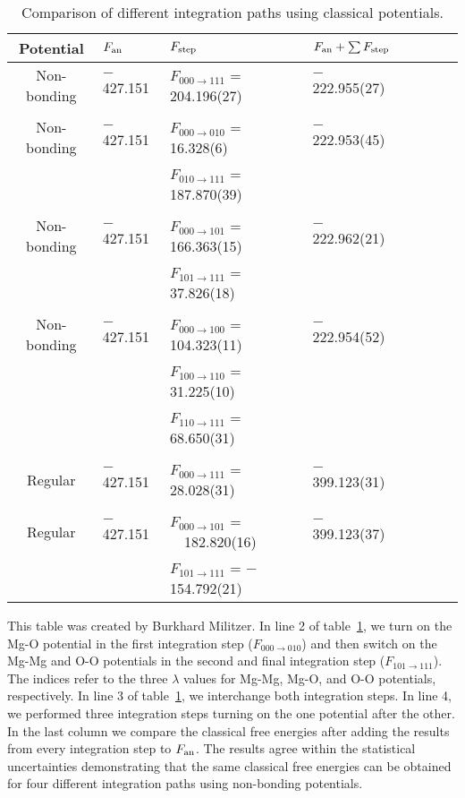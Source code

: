  \begin{table}[!h]
     \centering
\caption{Comparison of different integration paths using classical potentials. 
  \label{tab:compare_int_path}}

     \begin{tabular}{clllllll}
         \hline
{Potential} & 
            {$F_{\rm an}$} & 
            {$F_{\rm step}$} & 
            {$F_{\rm an} + \sum F_{\rm step}$} \\
         \hline
Non-bonding & $-$427.151 & $F_{000 \to 111}$ = 204.196(27)      & $-$222.955(27)
\\[1mm]\hline\\[-2.5mm]
Non-bonding & $-$427.151 & $F_{000 \to 010}$ = $\,\:$16.328(6)  & $-$222.953(45)\\
           &          & $F_{010 \to 111}$ = 187.870(39) 
\\[1mm]\hline\\[-2.5mm]
Non-bonding & $-$427.151 & $F_{000 \to 101}$ = 166.363(15)      & $-$222.962(21)\\
           &          & $F_{101 \to 111}$ = $\,\:$37.826(18)
\\[1mm]\hline\\[-2.5mm]
Non-bonding & $-$427.151 & $F_{000 \to 100}$ = 104.323(11)      & $-$222.954(52)\\
           &          & $F_{100 \to 110}$ = $\,\:$31.225(10) \\
           &          & $F_{110 \to 111}$ = $\,\:$68.650(31)
\\[1mm]\hline\\[-2.5mm]
Regular     & $-$427.151 & $F_{000 \to 111}$ = $\,\:$28.028(31) & $-$399.123(31) 
\\[1mm]\hline\\[-2.5mm]
Regular     & $-$427.151 & $F_{000 \to 101}$ = ~~182.820(16)      & $-$399.123(37) \\
           &          & $F_{101 \to 111}$ = $-$154.792(21) \\
\hline
\end{tabular}
\end{table}

This table was created by Burkhard Militzer. In line 2 of
table~\ref{tab:compare_int_path}, we turn on the Mg-O potential in the first
integration step ($F_{000 \to 010}$) and then switch on the Mg-Mg and O-O potentials
in the second and final integration step ($F_{101 \to 111}$). The indices refer to
the three $\lambda$ values for Mg-Mg, Mg-O, and O-O potentials, respectively. In line
3 of table~\ref{tab:compare_int_path}, we interchange both integration steps. In line
4, we performed three integration steps turning on the one potential after the other.
In the last column we compare the classical free energies after adding the results
from every integration step to $F_{\rm an}$. The results agree within the statistical
uncertainties demonstrating that the same classical free energies can be obtained for
four different integration paths using non-bonding potentials.


